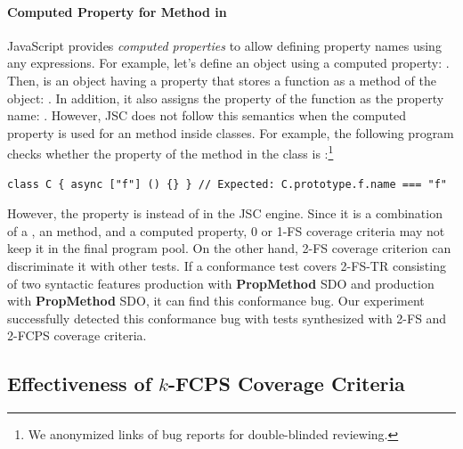 \paragraph{\textbf{Computed Property for  Method in
}}
%
JavaScript provides \textit{computed properties} to
allow defining property names using any expressions.
%
For example, let's define an object using a computed property: .
%
Then,  is an object having a property  that stores a
function as a method of the object: .
%
In addition, it also assigns the  property of the function as the
property name: .
%
However, JSC does not follow this semantics when the computed property
is used for an  method inside classes.
%
For example, the following program checks whether the  property of
the  method in the class  is :\footnote{
  We anonymized links of bug reports for double-blinded reviewing.
}
%
\begin{lstlisting}[style=JS, basicstyle=\footnotesize\ttfamily]
    class C { async ["f"] () {} } // Expected: C.prototype.f.name === "f"
\end{lstlisting}
%
However, the  property is  instead of 
in the JSC engine.
%
Since it is a combination of a , an  method, and a
computed property, 0 or 1-FS coverage criteria may not keep it in the final
program pool.
On the other hand, 2-FS coverage criterion can discriminate it with other tests.
%
If a conformance test covers 2-FS-TR consisting of two syntactic features
 production with \textbf{PropMethod} SDO and
 production with \textbf{PropMethod} SDO,
it can find this conformance bug.
Our experiment successfully detected this conformance bug with tests synthesized
with 2-FS and 2-FCPS coverage criteria.


\subsection{Effectiveness of $k$-FCPS Coverage Criteria}\label{sec:impact-k-fcps}

